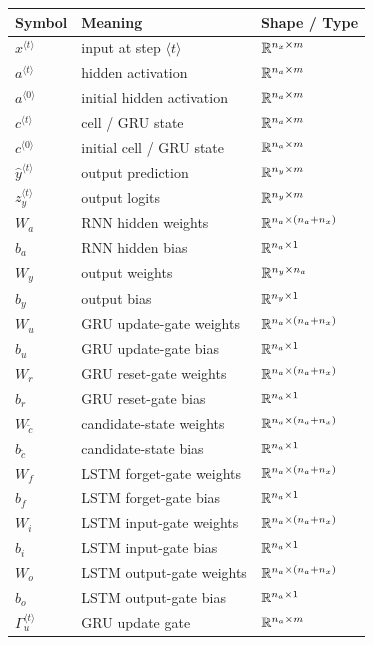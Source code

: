 \begin{center}
\begin{tabular}{lll}
\toprule
Symbol & Meaning & Shape / Type \\
\midrule
$x^{\langle t\rangle}$ & input at step $\langle t\rangle$ & $\mathbb{R}^{n_x \times m}$ \\
$a^{\langle t\rangle}$ & hidden activation & $\mathbb{R}^{n_a \times m}$ \\
$a^{\langle 0\rangle}$ & initial hidden activation & $\mathbb{R}^{n_a \times m}$ \\
$c^{\langle t\rangle}$ & cell / GRU state & $\mathbb{R}^{n_a \times m}$ \\
$c^{\langle 0\rangle}$ & initial cell / GRU state & $\mathbb{R}^{n_a \times m}$ \\
$\hat{y}^{\langle t\rangle}$ & output prediction & $\mathbb{R}^{n_y \times m}$ \\
$z_y^{\langle t\rangle}$ & output logits & $\mathbb{R}^{n_y \times m}$ \\
$W_a$ & RNN hidden weights & $\mathbb{R}^{n_a \times (n_a+n_x)}$ \\
$b_a$ & RNN hidden bias & $\mathbb{R}^{n_a \times 1}$ \\
$W_y$ & output weights & $\mathbb{R}^{n_y \times n_a}$ \\
$b_y$ & output bias & $\mathbb{R}^{n_y \times 1}$ \\
$W_u$ & GRU update-gate weights & $\mathbb{R}^{n_a \times (n_a+n_x)}$ \\
$b_u$ & GRU update-gate bias & $\mathbb{R}^{n_a \times 1}$ \\
$W_r$ & GRU reset-gate weights & $\mathbb{R}^{n_a \times (n_a+n_x)}$ \\
$b_r$ & GRU reset-gate bias & $\mathbb{R}^{n_a \times 1}$ \\
$W_{\tilde{c}}$ & candidate-state weights & $\mathbb{R}^{n_a \times (n_a+n_x)}$ \\
$b_{\tilde{c}}$ & candidate-state bias & $\mathbb{R}^{n_a \times 1}$ \\
$W_f$ & LSTM forget-gate weights & $\mathbb{R}^{n_a \times (n_a+n_x)}$ \\
$b_f$ & LSTM forget-gate bias & $\mathbb{R}^{n_a \times 1}$ \\
$W_i$ & LSTM input-gate weights & $\mathbb{R}^{n_a \times (n_a+n_x)}$ \\
$b_i$ & LSTM input-gate bias & $\mathbb{R}^{n_a \times 1}$ \\
$W_o$ & LSTM output-gate weights & $\mathbb{R}^{n_a \times (n_a+n_x)}$ \\
$b_o$ & LSTM output-gate bias & $\mathbb{R}^{n_a \times 1}$ \\
$\Gamma_u^{\langle t\rangle}$ & GRU update gate & $\mathbb{R}^{n_a \times m}$ \\

\end{tabular}
\end{center}
